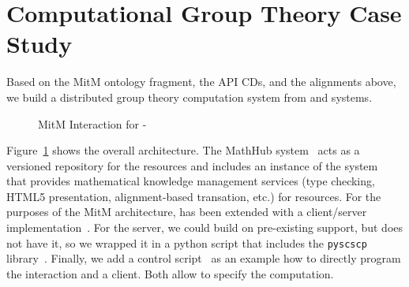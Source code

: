 \section{Computational Group Theory Case Study}\label{sec:case}
Based on the MitM ontology fragment, the API CDs, and the alignments above, we build a
distributed group theory computation system from \GAP and \Singular
systems.

\begin{figure}[ht]\centering
  \caption{MitM Interaction for \GAP-\Singular}\label{fig:mitmpoc}
\end{figure}

Figure~\ref{fig:mitmpoc} shows the overall architecture. The MathHub
system~\cite{IanJucKoh:sdm14,MathHub:on} acts as a versioned repository for the \OMMT
resources and includes an instance of the \MMT system~\cite{Rabe:MAGMS13} that provides
mathematical knowledge management services (type checking, HTML5 presentation,
alignment-based transation, etc.) for \OMMT resources. For the purposes of the MitM
architecture, \MMT has been extended with a \SCSCP client/server
implementation~\cite{twiesing:msc17}. For the \GAP server, we could build on pre-existing
\SCSCP support, but \Singular does not have it, so we wrapped it in a python script that
includes the \lstinline|pyscscp| library~\cite{py-scscp:on}. Finally, we add a \Python
control script~\cite{MitM-PoC} as an example how to directly program the interaction and a
\Sage client. Both allow to specify the computation.

